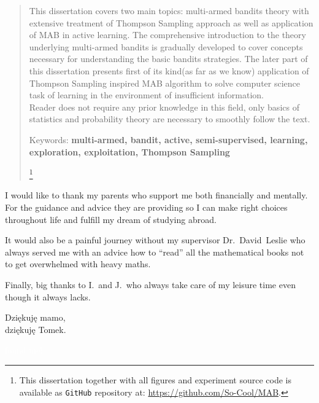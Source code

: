 \documentclass[12pt, a4paper, pdflatex, leqno]{report}
\newenvironment{dedication}
  {\clearpage           %
   \thispagestyle{empty}%
   \vspace*{\stretch{1}}%
   \itshape             %
   \raggedright          %
   \par\setlength{\leftskip}{0.3\textwidth}\noindent\ignorespaces
  }
  {\par %
   \vspace{\stretch{3}} %
   \clearpage           %
  }
\begin{document}
\begin{abstract}
\thispagestyle{empty}%
This dissertation covers two main topics: multi-armed bandits theory with extensive treatment of Thompson Sampling approach as well as application of MAB in active learning. The comprehensive introduction to the theory underlying multi-armed bandits is gradually developed to cover concepts necessary for understanding the basic bandits strategies. The later part of this dissertation presents first of its kind(as far as we know) application of Thompson Sampling inspired MAB algorithm to solve computer science task of learning in the environment of insufficient information.\\
Reader does not require any prior knowledge in this field, only basics of statistics and probability theory are necessary to smoothly follow the text.\\
\begin{center}
Keywords: \textbf{multi-armed, bandit, active, semi-supervised, learning, exploration, exploitation, Thompson Sampling}

\let\thefootnote\relax\footnote{\noindent This dissertation together with all figures and experiment source code is available as \texttt{GitHub} repository at: \url{https://github.com/So-Cool/MAB}.}

\end{center}
\end{abstract}

\begin{dedication}
I would like to thank my parents who support me both financially and mentally. For the guidance and advice they are providing so I can make right choices throughout life and fulfill my dream of studying abroad.\newline

It would also be a painful journey without my supervisor Dr.~David~Leslie who always served me with an advice how to ``read'' all the mathematical books not to get overwhelmed with heavy maths.\newline

Finally, big thanks to I.\ and J.\ who always take care of my leisure time even though it always lacks.\\[2cm]


\begin{flushright}
Dzi\k{e}kuj\k{e} mamo,\\
dzi\k{e}kuj\k{e} Tomek.
\end{flushright}



\textcolor{white}{found me!}



\end{dedication}
\end{document}
